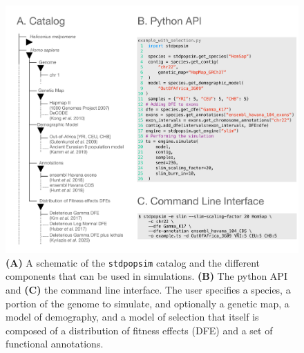 \documentclass[hidelinks]{article}
\newcommand{\stdpopsim}{\texttt{stdpopsim}\xspace}
\begin{document}
    \begin{figure}[t!]
        \includegraphics[width=\linewidth]{figures/schematics/catalog.pdf}
        \caption{\label{fig:schematic}
        \textbf{(A)} A schematic of the \stdpopsim catalog and the different components that
        can be used in simulations. 
        \textbf{(B)} The python API and \textbf{(C)} the command line interface.
        The user specifies a species, a portion of
        the genome to simulate, and optionally a genetic map, a model of
        demography, and a model of selection that itself is composed of a
        distribution of fitness effects (DFE) and a set of functional
        annotations. }
    \end{figure}
\end{document}
